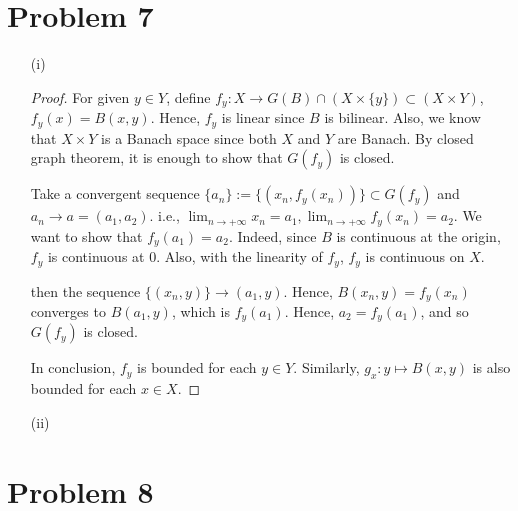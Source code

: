 \documentclass[12pt]{article}
\begin{document}
\section*{Problem 7}

\begin{enumerate}

\item [(i)]

\begin{proof}

For given $y\in Y$, define $f_y: X \rightarrow G(B)\cap (X\times\{y\}) \subset (X\times Y)$, $f_y(x) = B(x, y)$. Hence, $f_y$ is linear since $B$ is bilinear. Also, we know that $X\times Y$ is a Banach space since both $X$ and $Y$ are Banach. By closed graph theorem, it is enough to show that $G(f_y)$ is closed.

Take a convergent sequence $\{a_n\}:= \{(x_n, f_y(x_n))\} \subset G(f_y)$ and $a_n \rightarrow a = (a_1, a_2)$. i.e., $\lim_{n\rightarrow +\infty} x_n = a_1, \lim_{n\rightarrow +\infty} f_y(x_n) = a_2$. We want to show that $f_y(a_1) = a_2$. Indeed, since $B$ is continuous at the origin, $f_y$ is continuous at $0$. Also, with the linearity of $f_y$, $f_y$ is continuous on $X$.

then the sequence $\{(x_n, y)\}\rightarrow (a_1, y)$. Hence, $B(x_n, y) = f_y(x_n)$ converges to $B(a_1, y)$, which is $f_y(a_1)$. Hence, $a_2 = f_y(a_1)$, and so $G(f_y)$ is closed.

In conclusion, $f_y$ is bounded for each $y\in Y$. Similarly, $g_x: y \mapsto B(x, y)$ is also bounded for each $x \in X$.

\end{proof}

\item[(ii)]





\end{enumerate}


\section*{Problem 8}
\end{document}
